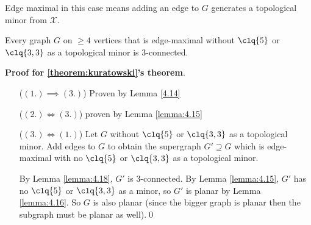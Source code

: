 Edge maximal in this case means adding an edge to $G$ generates a topological minor from $\mathcal{X}$.
\begin{customlemma}{4.18}
\label{lemma:4.18}
    Every graph $G$ on $\geq 4$ vertices that is edge-maximal without $\clq{5}$ or $\clq{3, 3}$ as a topological minor is $3$-connected.
\end{customlemma}
\begin{prf}
    \textbf{Proof for \ref{theorem:kuratowski}'s theorem}.

    \begin{itemize}
        \item[($(1.) \implies (3.)$)] Proven by Lemma \ref{4.14}
        \item[($(2.) \iff (3.)$)] proven by Lemma \ref{lemma:4.15}
        \item[($(3.) \iff (1.)$)] Let $G$ without $\clq{5}$ or $\clq{3, 3}$ as a topological minor. Add edges to $G$ to obtain the supergraph $G' \supseteq G$ which is edge-maximal with no $\clq{5}$ or $\clq{3, 3}$ as a topological minor.
        
        By Lemma \ref{lemma:4.18}, $G'$ is $3$-connected. By Lemma \ref{lemma:4.15}, $G'$ has no $\clq{5}$ or $\clq{3, 3}$ as a minor, so $G'$ is planar by Lemma \ref{lemma:4.16}. So $G$ is also planar (since the bigger graph is planar then the subgraph must be planar as well).\qed
    \end{itemize}
\end{prf}